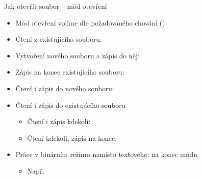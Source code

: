 \begin{frame}{Jak otevřít soubor -- mód otevření}

  \begin{itemize}
    \item Mód otevření volíme dle požadovaného chování ()

    \pause

    \item Čtení z existujícího souboru: 
    \item Vytvoření nového souboru a zápis do něj: 

    \pause

    \item Zápis na konec existujícího souboru: 

    \pause

    \item Čtení i zápis do nového souboru: 

    \item Čtení i zápis do existujícího souboru
    \begin{itemize}
      \item Čtení i zápis kdekoli: 
      \item Čtení kdekoli, zápis na konec: 
    \end{itemize}

    \pause

    \item Práce v binárním režimu namísto textového:  na konec módu
    \begin{itemize}
      \item Např.\ 
    \end{itemize}
  \end{itemize}

\end{frame}

